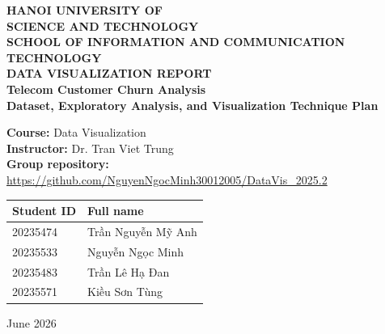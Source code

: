 \begin{titlepage}
\thispagestyle{empty}
\centering
\textbf{\LARGE HANOI UNIVERSITY OF}\\[0.35cm]
\textbf{\LARGE SCIENCE AND TECHNOLOGY}\\[1.0cm]
\textbf{\Large SCHOOL OF INFORMATION AND COMMUNICATION TECHNOLOGY}\\[2.0cm]

\textbf{\Huge DATA VISUALIZATION REPORT}\\[0.75cm]
\textbf{\Large Telecom Customer Churn Analysis}\\[0.35cm]
\textbf{\large Dataset, Exploratory Analysis, and Visualization Technique Plan}\\[1.5cm]

\vfill
\begin{flushleft}
\textbf{Course:} Data Visualization\\[0.25cm]
\textbf{Instructor:} Dr. Tran Viet Trung\\[0.25cm]
\textbf{Group repository:} \url{https://github.com/NguyenNgocMinh30012005/DataVis_2025.2}
\end{flushleft}

\vspace{0.75cm}
\begin{center}
\begin{tabular}{ll}
\toprule
\textbf{Student ID} & \textbf{Full name} \\
\midrule
20235474 & Trần Nguyễn Mỹ Anh \\
20235533 & Nguyễn Ngọc Minh \\
20235483 & Trần Lê Hạ Đan \\
20235571 & Kiều Sơn Tùng \\
\bottomrule
\end{tabular}
\end{center}

\vfill
\large June 2026
\end{titlepage}
\newpage
{}

\begin{abstract}
This report presents our customer churn analysis workflow, from the public
Kaggle dataset to exploratory analysis, feature grouping, model-assisted
retention prioritization, and the final Power BI dashboard. The dataset was
downloaded from Kaggle and split into churned and non-churned customer files for
analysis. Following the course capstone guideline, we document the dataset
source, churn-rate interpretation, Random Forest workflow, and the visualization
techniques used in the final dashboard screenshots. The dashboard prioritizes
clear denominators, readable comparisons, a colorblind-aware palette, and
interactive risk exploration over adding every possible chart type.
\end{abstract}
\newpage
